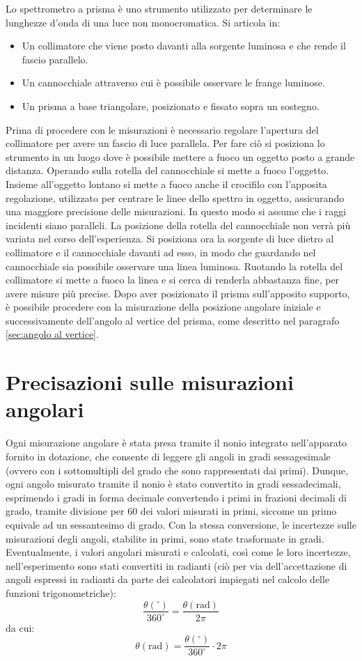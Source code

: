 \documentclass[a4paper,12pt]{article}
\begin{document}
Lo spettrometro a prisma è uno strumento utilizzato per determinare le lunghezze d’onda di una luce non monocromatica. Si articola in: 
\begin{itemize}
    \item Un collimatore che viene posto davanti alla sorgente luminosa e che rende il fascio parallelo. 
    \item Un cannocchiale attraverso cui è possibile osservare le frange luminose. 
    \item Un prisma a base triangolare, posizionato e fissato sopra un sostegno. 
\end{itemize}
Prima di procedere con le misurazioni è necessario regolare l’apertura del collimatore per avere un fascio di luce parallela. Per fare ciò si posiziona lo strumento in un luogo dove è possibile mettere a fuoco un oggetto posto a grande distanza. Operando sulla rotella del cannocchiale si mette a fuoco l’oggetto. Insieme all'oggetto lontano si mette a fuoco anche il crocifilo con l'apposita regolazione, utilizzato per centrare le linee dello spettro in oggetto, assicurando una maggiore precisione delle misurazioni. In questo modo si assume che i raggi incidenti siano paralleli. La posizione della rotella del cannocchiale non verrà più variata nel corso dell’esperienza.  
Si posiziona ora la sorgente di luce dietro al collimatore e il cannocchiale davanti ad esso, in modo che guardando nel cannocchiale sia possibile osservare una linea luminosa. Ruotando la rotella del collimatore si mette a fuoco la linea e si cerca di renderla abbastanza fine, per avere misure più precise.  
Dopo aver posizionato il prisma sull’apposito supporto, è possibile procedere con la misurazione della posizione angolare iniziale e successivamente dell'angolo al vertice del prisma, come descritto nel paragrafo \ref{sec:angolo al vertice}.

\section{Precisazioni sulle misurazioni angolari}
Ogni misurazione angolare è stata presa tramite il nonio integrato nell’apparato fornito in dotazione, che consente di leggere gli angoli in gradi sessagesimale (ovvero con i sottomultipli del grado che sono rappresentati dai primi). Dunque, ogni angolo misurato tramite il nonio è stato convertito in gradi sessadecimali, esprimendo i gradi in forma decimale convertendo i primi in frazioni decimali di grado, tramite divisione per 60 dei valori misurati in primi, siccome un primo equivale ad un sessantesimo di grado. Con la stessa conversione, le incertezze sulle misurazioni degli angoli, stabilite in primi, sono state trasformate in gradi. Eventualmente, i valori angolari misurati e calcolati, così come le loro incertezze, nell’esperimento sono stati convertiti in radianti (ciò per via dell’accettazione di angoli espressi in radianti da parte dei calcolatori impiegati nel calcolo delle funzioni trigonometriche):
\[
\frac{\theta (^\circ)}{360^\circ} = \frac{\theta (\text{rad})}{2\pi}
\]
da cui:
\[
\theta (\text{rad}) = \frac{\theta (^\circ)}{360^\circ} \cdot 2\pi
\]
\end{document}
